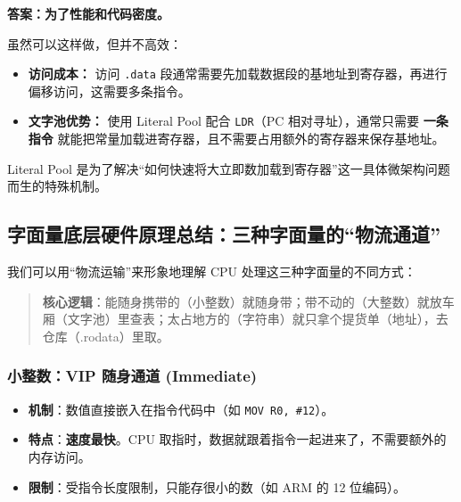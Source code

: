 \textbf{答案：为了性能和代码密度。}

\vspace{1em}

虽然可以这样做，但并不高效：
\begin{itemize}
    \item \textbf{访问成本：} 访问 \texttt{.data} 段通常需要先加载数据段的基地址到寄存器，再进行偏移访问，这需要多条指令。
    \item \textbf{文字池优势：} 使用 Literal Pool 配合 \texttt{LDR}（PC 相对寻址），通常只需要 \textbf{一条指令} 就能把常量加载进寄存器，且不需要占用额外的寄存器来保存基地址。
\end{itemize}
Literal Pool 是为了解决“如何快速将大立即数加载到寄存器”这一具体微架构问题而生的特殊机制。




















\subsection{字面量底层硬件原理总结：三种字面量的“物流通道”}

我们可以用“物流运输”来形象地理解 CPU 处理这三种字面量的不同方式：

\begin{quote}
\textbf{核心逻辑}：能随身携带的（小整数）就随身带；带不动的（大整数）就放车厢（文字池）里查表；太占地方的（字符串）就只拿个提货单（地址），去仓库（.rodata）里取。
\end{quote}

\subsubsection{小整数：VIP 随身通道 (Immediate)}
\begin{itemize}
    \item \textbf{机制}：数值直接嵌入在指令代码中（如 \texttt{MOV R0, \#12}）。
    \item \textbf{特点}：\textbf{速度最快}。CPU 取指时，数据就跟着指令一起进来了，不需要额外的内存访问。
    \item \textbf{限制}：受指令长度限制，只能存很小的数（如 ARM 的 12 位编码）。
\end{itemize}

